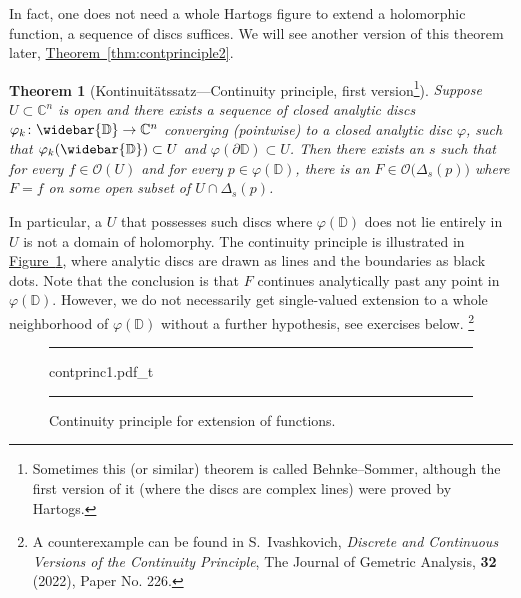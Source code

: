 \documentclass[12pt,openany]{book}
\newcommand{\C}{{\mathbb{C}}}
\newcommand{\D}{{\mathbb{D}}}
\newcommand{\sO}{{\mathscr{O}}}
\theoremstyle{plain}
\newtheorem{thm}{Theorem}[section]
\theoremstyle{remark}
\theoremstyle{definition}
\newenvironment{myfig}{%
\begin{figure}[h!t]
\noindent\rule{\textwidth}{0.5pt}\vspace{12pt}\par\centering}%
{\par\noindent\rule{\textwidth}{0.5pt}
\end{figure}}
\theoremstyle{exercise}
\theoremstyle{example}
\newcommand{\figureref}[1]{\hyperref[#1]{Figure~\ref*{#1}}}
\newcommand{\thmref}[1]{\hyperref[#1]{Theorem~\ref*{#1}}}
\begin{document}
In fact, one does not need a whole Hartogs figure to extend a holomorphic
function, a sequence of discs suffices.  We will see another version of
this theorem later, \thmref{thm:contprinciple2}.

\begin{thm}[Kontinuit\"atssatz---Continuity
principle, first version\footnote{%
Sometimes this (or similar) theorem is called Behnke--Sommer, although the
first version of it (where the discs are complex lines) were proved by Hartogs.}]
\label{thm:contprinciple1}
Suppose $U \subset \C^n$ is open and there exists a sequence of
closed analytic discs $\varphi_k \colon \widebar{\D} \to \C^n$ converging
(pointwise) to a closed analytic disc $\varphi$, such that
$\varphi_k(\widebar{\D}) \subset U$ and $\varphi(\partial \D) \subset U$.
Then there exists an $s$ such that for every $f \in \sO(U)$
and for every $p \in \varphi(\D)$,
there is an $F \in \sO\bigl(\Delta_s(p)\bigr)$ where $F=f$ on some
open subset of $U \cap \Delta_s(p)$.
\end{thm}

In particular, a $U$ that possesses such discs where $\varphi(\D)$ does not
lie entirely in $U$ is not a domain of holomorphy.
The continuity principle is illustrated in \figureref{fig:contprinc1}, where
analytic discs are drawn as lines and the boundaries as black dots.
Note that the conclusion is that $F$ continues analytically past any point
in $\varphi(\D)$.
However, we do not necessarily get single-valued extension to a whole
neighborhood of $\varphi(\D)$ without a further hypothesis,
see exercises below.%
\footnote{A counterexample can be found in S.\ Ivashkovich, \emph{Discrete
and Continuous Versions of the Continuity Principle}, The Journal of
Gemetric Analysis, \textbf{32} (2022), Paper No. 226.}

\begin{myfig}
{contprinc1.pdf_t}
\caption{Continuity principle for extension of
functions.\label{fig:contprinc1}}
\end{myfig}
\end{document}

